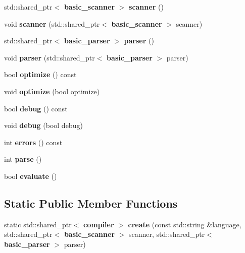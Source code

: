 \begin{DoxyCompactItemize}
\item 
\mbox{\label{classcdk_1_1compiler_abc44fb2cd388b0c4f76e0797e0972ecf}} 
std\+::shared\+\_\+ptr$<$ \textbf{ basic\+\_\+scanner} $>$ {\bfseries scanner} ()
\item 
\mbox{\label{classcdk_1_1compiler_a4ee8a64e131f0fd1d179e8be8d88e654}} 
void {\bfseries scanner} (std\+::shared\+\_\+ptr$<$ \textbf{ basic\+\_\+scanner} $>$ scanner)
\item 
\mbox{\label{classcdk_1_1compiler_a701f3411ada26d678b133134f492e6dd}} 
std\+::shared\+\_\+ptr$<$ \textbf{ basic\+\_\+parser} $>$ {\bfseries parser} ()
\item 
\mbox{\label{classcdk_1_1compiler_a52a6e6b5cfa7361ceb0372ef6b4a9f73}} 
void {\bfseries parser} (std\+::shared\+\_\+ptr$<$ \textbf{ basic\+\_\+parser} $>$ parser)
\item 
\mbox{\label{classcdk_1_1compiler_a23a67b0daf438a0ac90413825341ff6b}} 
bool {\bfseries optimize} () const
\item 
\mbox{\label{classcdk_1_1compiler_afd34aede83f1a60e8f2685b7a9e31ffe}} 
void {\bfseries optimize} (bool optimize)
\item 
\mbox{\label{classcdk_1_1compiler_ac7f77a847c841602342caf5b0e43c2a5}} 
bool {\bfseries debug} () const
\item 
\mbox{\label{classcdk_1_1compiler_a672a0cd7f68b61956fdbd541b21445a1}} 
void {\bfseries debug} (bool debug)
\item 
\mbox{\label{classcdk_1_1compiler_aa72626ba181a0ec880abb18def9804fd}} 
int {\bfseries errors} () const
\item 
\mbox{\label{classcdk_1_1compiler_a1f39738f2142ebdabfc2122b635fa9d7}} 
int {\bfseries parse} ()
\item 
bool \textbf{ evaluate} ()
\end{DoxyCompactItemize}
\subsection*{Static Public Member Functions}
\begin{DoxyCompactItemize}
\item 
\mbox{\label{classcdk_1_1compiler_a0e14073a550646ab3ffeb20ec2c31691}} 
static std\+::shared\+\_\+ptr$<$ \textbf{ compiler} $>$ {\bfseries create} (const std\+::string \&language, std\+::shared\+\_\+ptr$<$ \textbf{ basic\+\_\+scanner} $>$ scanner, std\+::shared\+\_\+ptr$<$ \textbf{ basic\+\_\+parser} $>$ parser)
\end{DoxyCompactItemize}
